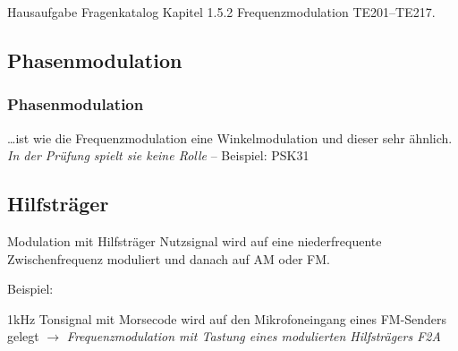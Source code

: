 \begin{frame}
  \begin{exampleblock}{Hausaufgabe}
    Fragenkatalog Kapitel 1.5.2 Frequenzmodulation TE201--TE217.
  \end{exampleblock}
\end{frame}

\subsection[PM]{Phasenmodulation}

\begin{frame}
    \frametitle{Phasenmodulation}

    \dots ist wie die Frequenzmodulation eine Winkelmodulation und dieser sehr ähnlich. \\[4em]

    \emph{In der Prüfung spielt sie keine Rolle} -- Beispiel: PSK31

\end{frame}


\subsection{Hilfsträger}
\begin{frame}{Modulation mit Hilfsträger}
  Nutzsignal wird auf eine niederfrequente Zwischenfrequenz moduliert und danach auf AM oder FM.
  \vspace{4em}

  Beispiel: \bigskip
  
  1kHz Tonsignal mit Morsecode wird auf den Mikrofoneingang eines FM-Senders gelegt
  $\rightarrow$ \emph{Frequenzmodulation mit Tastung eines modulierten Hilfsträgers F2A}
\end{frame}

